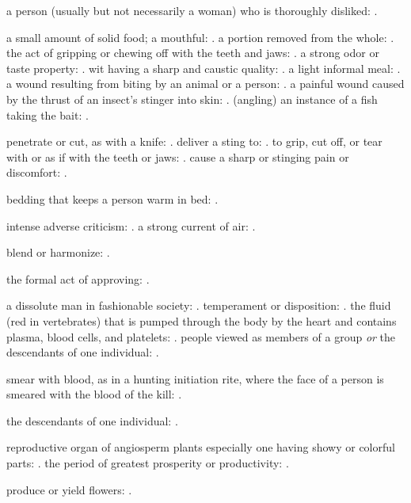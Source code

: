   a person (usually but not necessarily a woman) who is thoroughly disliked: .

  a small amount of solid food; a mouthful: \vocab{}. a portion removed from the whole: . the act of gripping or chewing off with the teeth and jaws: . a strong odor or taste property: . wit having a sharp and caustic quality: . a light informal meal: . a wound resulting from biting by an animal or a person: . a painful wound caused by the thrust of an insect's stinger into skin: . (angling) an instance of a fish taking the bait: .

  penetrate or cut, as with a knife: . deliver a sting to: . to grip, cut off, or tear with or as if with the teeth or jaws: . cause a sharp or stinging pain or discomfort: .

  bedding that keeps a person warm in bed: .

  intense adverse criticism: . a strong current of air: .

  blend or harmonize: .

  the formal act of approving: .

  a dissolute man in fashionable society: . temperament or disposition: . the fluid (red in vertebrates) that is pumped through the body by the heart and contains plasma, blood cells, and platelets: . people viewed as members of a group \textit{or} the descendants of one individual: .

  smear with blood, as in a hunting initiation rite, where the face of a person is smeared with the blood of the kill: .

  the descendants of one individual: .

  reproductive organ of angiosperm plants especially one having showy or colorful parts: . the period of greatest prosperity or productivity: .

  produce or yield flowers: .

